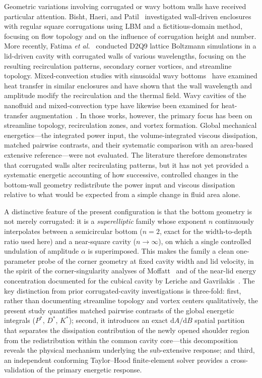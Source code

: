 Geometric variations involving corrugated or wavy bottom walls have received particular attention. Bisht, Haeri, and Patil~\cite{Bisht2017} investigated wall-driven enclosures with regular square corrugations using LBM and a fictitious-domain method, focusing on flow topology and on the influence of corrugation height and number. More recently, Fatima \emph{et al.}~\cite{Fatima2023} conducted D2Q9 lattice Boltzmann simulations in a lid-driven cavity with corrugated walls of various wavelengths, focusing on the resulting recirculation patterns, secondary corner vortices, and streamline topology. Mixed-convection studies with sinusoidal wavy bottoms~\cite{AlAmiri2007,Nasrin2011} have examined heat transfer in similar enclosures and have shown that the wall wavelength and amplitude modify the recirculation and the thermal field. Wavy cavities of the nanofluid and mixed-convection type have likewise been examined for heat-transfer augmentation~\cite{AbuNada2014}. In those works, however, the primary focus has been on streamline topology, recirculation zones, and vortex formation. Global mechanical energetics---the integrated power input, the volume-integrated viscous dissipation, matched pairwise contrasts, and their systematic comparison with an area-based extensive reference---were not evaluated. The literature therefore demonstrates that corrugated walls alter recirculating patterns, but it has not yet provided a systematic energetic accounting of how successive, controlled changes in the bottom-wall geometry redistribute the power input and viscous dissipation relative to what would be expected from a simple change in fluid area alone.

A distinctive feature of the present configuration is that the bottom geometry is not merely corrugated: it is a \emph{superelliptic} family whose exponent $n$ continuously interpolates between a semicircular bottom ($n=2$, exact for the width-to-depth ratio used here) and a near-square cavity ($n\to\infty$), on which a single controlled undulation of amplitude $\alpha$ is superimposed. This makes the family a clean one-parameter probe of the corner geometry at fixed cavity width and lid velocity, in the spirit of the corner-singularity analyses of Moffatt~\cite{Moffatt1964} and of the near-lid energy concentration documented for the cubical cavity by Leriche and Gavrilakis~\cite{Leriche2000}. The key distinction from prior corrugated-cavity investigations is three-fold:
first, rather than documenting streamline topology and vortex centers qualitatively, the present study quantifies matched pairwise contrasts of the global energetic integrals ($P^*$, $D^*$, $K^*$);
second, it introduces an exact $\mathrm{d}A/\mathrm{d}B$ spatial partition that separates the dissipation contribution of the newly opened shoulder region from the redistribution within the common cavity core---this decomposition reveals the physical mechanism underlying the sub-extensive response;
and third, an independent conforming Taylor--Hood finite-element solver provides a cross-validation of the primary energetic response.

